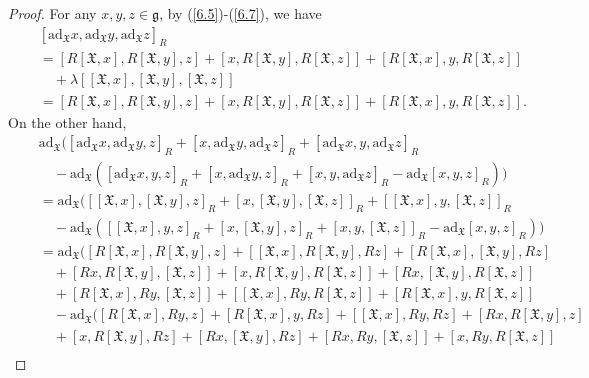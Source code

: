 \documentclass[12pt]{amsart}
\theoremstyle{definition}
\begin{document}
\begin{proof}
For any $x, y,z \in \mathfrak{g}$, by (\ref{6.5})-(\ref{6.7}), we have
\begin{align*}
&[\mathrm{ad}_\mathfrak{X}x, \mathrm{ad}_\mathfrak{X}y, \mathrm{ad}_\mathfrak{X}z]_R\\
&=[R[\mathfrak{X}, x], R[\mathfrak{X}, y], z]+[x, R[\mathfrak{X}, y], R[\mathfrak{X}, z]]+[R[\mathfrak{X}, x], y, R[\mathfrak{X}, z]]\\
\quad&\quad+\lambda[[\mathfrak{X}, x], [\mathfrak{X}, y], [\mathfrak{X}, z]]\\
&=[R[\mathfrak{X}, x], R[\mathfrak{X}, y], z]+[x, R[\mathfrak{X}, y], R[\mathfrak{X}, z]]+[R[\mathfrak{X}, x], y, R[\mathfrak{X}, z]].
\end{align*}
On the other hand,
\begin{align*}
&\mathrm{ad}_\mathfrak{X}\big( [\mathrm{ad}_\mathfrak{X}x, \mathrm{ad}_\mathfrak{X}y, z]_R+[x, \mathrm{ad}_\mathfrak{X}y, \mathrm{ad}_\mathfrak{X}z]_R+[\mathrm{ad}_\mathfrak{X}x, y, \mathrm{ad}_\mathfrak{X}z]_R\\
\quad & \quad -\mathrm{ad}_\mathfrak{X}([\mathrm{ad}_\mathfrak{X}x, y, z]_R+[x, \mathrm{ad}_\mathfrak{X}y, z]_R+[x, y, \mathrm{ad}_\mathfrak{X}z]_R-\mathrm{ad}_\mathfrak{X}[x, y, z]_R)\big)\\
\quad&=\mathrm{ad}_\mathfrak{X}\Big( [[\mathfrak{X}, x], [\mathfrak{X}, y], z]_R+[x, [\mathfrak{X}, y], [\mathfrak{X}, z]]_R+[[\mathfrak{X}, x], y, [\mathfrak{X}, z]]_R\\
\quad&\quad -\mathrm{ad}_\mathfrak{X}([[\mathfrak{X}, x], y, z]_R+[x, [\mathfrak{X}, y], z]_R+[x, y, [\mathfrak{X}, z]]_R-\mathrm{ad}_\mathfrak{X}[x, y, z]_R)\Big)\\
&=\mathrm{ad}_\mathfrak{X}\Big( [R[\mathfrak{X}, x], R[\mathfrak{X}, y], z]+[[\mathfrak{X}, x], R[\mathfrak{X}, y], Rz]+[R[\mathfrak{X}, x], [\mathfrak{X}, y], Rz]\\
\quad&\quad+[Rx, R[\mathfrak{X}, y], [\mathfrak{X}, z]]+[x, R[\mathfrak{X}, y], R[\mathfrak{X}, z]]+[Rx, [\mathfrak{X}, y], R[\mathfrak{X}, z]]\\
\quad&\quad+[R[\mathfrak{X}, x], Ry, [\mathfrak{X}, z]]+[[\mathfrak{X}, x], Ry, R[\mathfrak{X}, z]]+[R[\mathfrak{X}, x], y, R[\mathfrak{X}, z]]\\
\quad&\quad-\mathrm{ad}_\mathfrak{X}([R[\mathfrak{X}, x], Ry, z]+[R[\mathfrak{X}, x], y, Rz]+[[\mathfrak{X}, x], Ry, Rz]+[Rx, R[\mathfrak{X}, y], z]\\
\quad&\quad+[x, R[\mathfrak{X}, y], Rz]+[Rx, [\mathfrak{X}, y], Rz]+[Rx, Ry, [\mathfrak{X}, z]]+[x, Ry, R[\mathfrak{X}, z]]\\

\end{align*}
\end{proof}
\end{document}
